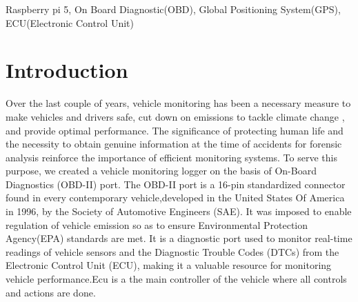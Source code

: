 \documentclass[conference]{IEEEtran}
\begin{document}
\begin{abstract}
The Automotive Diagnostic and Activity Monitoring (ADAM) System is an integrated solution designed to provide real-time insights into the health and behavior of four-wheeled vehicles. Acting as both a diagnostic tool and a forensic black box, ADAM harmonizes multiple sensing modules—including a Global Positioning System (GPS), a gyroscope and accelerometer (MPU6050), and a vibration sensor (SW-420)—to observe vehicular dynamics. At its core, the system interfaces with the vehicle’s Electronic Control Unit (ECU) via the On-Board Diagnostics (OBD) port, enabling deep access to engine parameters and fault codes.Sensor data is continuously collected, securely stored on an SD card, and synchronized with a PostgreSQL database. This rich dataset fuels a suite of machine learning models tailored for four key objectives: (1) Engine Health Monitoring, (2) Fuel Economy Analysis, (3) Driver Behavior Profiling, and (4) Predictive Maintenance. Insights derived from these models are visually rendered through an intuitive mobile application that presents the information via dynamic graphs and charts.To further enhance user engagement, the system incorporates an interactive AI-powered chatbot capable of responding to user queries and guiding necessary actions. Together, these components form a cohesive ecosystem—bridging vehicle intelligence with user accessibility, and paving the way for smarter, safer, and more informed driving experiences.

\end{abstract}

\begin{IEEEkeywords}
Raspberry pi 5, On Board Diagnostic(OBD), Global Positioning System(GPS), ECU(Electronic Control Unit)
\end{IEEEkeywords}

\section{Introduction}
Over the last couple of years, vehicle monitoring has been a necessary measure to make vehicles and drivers safe, cut down on emissions to tackle climate change , and provide optimal performance. The significance of protecting human life and the necessity to obtain genuine information at the time of accidents for forensic analysis reinforce the importance of efficient monitoring systems. To serve this purpose, we created a vehicle monitoring logger on the basis of On-Board Diagnostics (OBD-II) port. The OBD-II port is a 16-pin standardized connector found in every contemporary vehicle,developed in the United States Of America in 1996, by the  Society of Automotive Engineers (SAE). It was imposed to enable regulation  of vehicle emission so as to ensure Environmental Protection Agency(EPA) standards are met. It is a diagnostic port used to monitor real-time readings of vehicle sensors and the Diagnostic Trouble Codes (DTCs) from the Electronic Control Unit (ECU), making it a valuable resource for monitoring vehicle performance.Ecu is a the main controller of the vehicle where all controls and actions are done.
\end{document}
